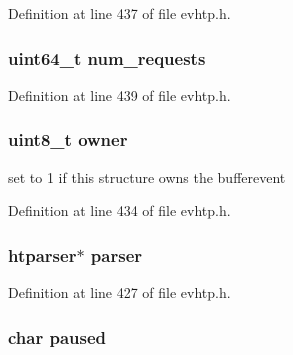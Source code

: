 \-Definition at line 437 of file evhtp.\-h.

\hypertarget{structevhtp__connection__s_a56f90fa0eaddefea2d0b62057dd9276c}{
\subsubsection[{num\-\_\-requests}]{\setlength{\rightskip}{0pt plus 5cm}uint64\-\_\-t {\bf num\-\_\-requests}}}\label{structevhtp__connection__s_a56f90fa0eaddefea2d0b62057dd9276c}


\-Definition at line 439 of file evhtp.\-h.

\hypertarget{structevhtp__connection__s_a1c3b8d8797515eea0e86cbdb2d85aed6}{
\subsubsection[{owner}]{\setlength{\rightskip}{0pt plus 5cm}uint8\-\_\-t {\bf owner}}}\label{structevhtp__connection__s_a1c3b8d8797515eea0e86cbdb2d85aed6}
set to 1 if this structure owns the bufferevent 

\-Definition at line 434 of file evhtp.\-h.

\hypertarget{structevhtp__connection__s_accaeb42c4c926437fc7921fa7910911b}{
\subsubsection[{parser}]{\setlength{\rightskip}{0pt plus 5cm}htparser$\ast$ {\bf parser}}}\label{structevhtp__connection__s_accaeb42c4c926437fc7921fa7910911b}


\-Definition at line 427 of file evhtp.\-h.

\hypertarget{structevhtp__connection__s_ac2ef7c4493180f5ffc32c19778bdbfbd}{
\subsubsection[{paused}]{\setlength{\rightskip}{0pt plus 5cm}char {\bf paused}}}\label{structevhtp__connection__s_ac2ef7c4493180f5ffc32c19778bdbfbd}


